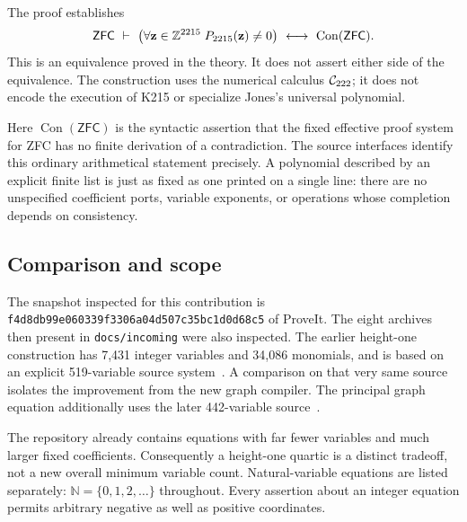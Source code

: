 \documentclass[11pt]{article}
\theoremstyle{definition}\newtheorem{definition}[theorem]{Definition}
\theoremstyle{remark}\newtheorem{remark}[theorem]{Remark}
\newcommand{\Z}{\mathbb Z}\newcommand{\N}{\mathbb N}
\newcommand{\Con}{\operatorname{Con}}\newcommand{\ZFC}{\mathsf{ZFC}}
\newcommand{\file}[1]{\nolinkurl{#1}}
\begin{document}
The proof establishes
\begin{equation}\label{eq:main}
 \ZFC\ \vdash\
 \left(\forall\mathbf z\in\Z^{\GraphVars}\;
                  P_{\GraphVars}(\mathbf z)\ne0\right)
       \ \longleftrightarrow\ \Con(\ZFC).
\end{equation}
This is an equivalence proved in the theory. It does not assert either side of
the equivalence. The construction uses the numerical calculus $\mathcal C_{222}$; it does
not encode the execution of K215 or specialize Jones's universal polynomial.

Here $\Con(\ZFC)$ is the syntactic assertion that the fixed effective proof
system for ZFC has no finite derivation of a contradiction. The source interfaces
identify this ordinary arithmetical statement precisely. A polynomial described
by an explicit finite list is just as fixed as one printed on a single line:
there are no unspecified coefficient ports, variable exponents, or operations
whose completion depends on consistency.

\subsection{Comparison and scope}


The snapshot inspected for this contribution is
\texttt{f4d8db99e060339f3306a04d507c35bc1d0d68c5} of ProveIt.
The eight archives then present in \file{docs/incoming} were also inspected.
The earlier height-one construction has 7,431 integer variables and 34,086
monomials, and is based on an explicit 519-variable source system~\cite{heightone}. A comparison
on that very same source isolates the improvement from the new graph compiler.
The principal graph equation additionally uses the later 442-variable source~\cite{round15}.

The repository already contains equations with far fewer variables and much
larger fixed coefficients. Consequently a height-one quartic is a distinct
tradeoff, not a new overall minimum variable count. Natural-variable equations
are listed separately: $\N=\{0,1,2,\ldots\}$ throughout. Every assertion about an
integer equation permits arbitrary negative as well as positive coordinates.
\end{document}
